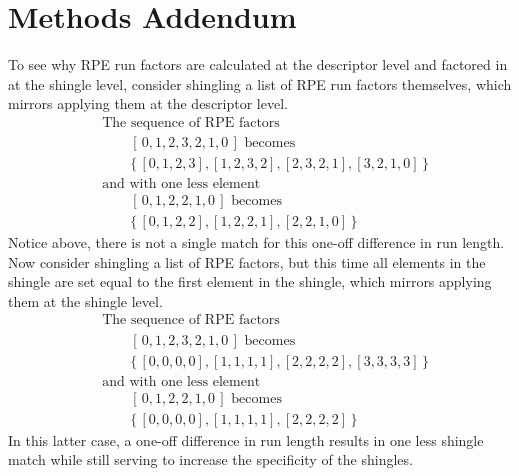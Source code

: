 \documentclass[letter]{article}
\begin{document}
\section{Methods Addendum}

To see why RPE run factors are calculated at the descriptor level and factored in at the shingle level, consider shingling a list of RPE run factors themselves, which mirrors applying them at the descriptor level. 
\begin{align*}
    &\text{The sequence of RPE factors} \\
    &\qquad[\, 0, 1, 2, 3, 2, 1, 0 \,] \text{ becomes} \\
    &\qquad\{\, [0, 1, 2, 3], [1, 2, 3, 2], [2, 3, 2, 1], [3, 2, 1, 0] \,\} \\
    &\text{and with one less element} \\
    &\qquad[\, 0, 1, 2, 2, 1, 0 \,] \text{ becomes} \\
    &\qquad\{\, [0, 1, 2, 2], [1, 2, 2, 1], [2, 2, 1, 0] \,\}
\end{align*}
Notice above, there is not a single match for this one-off difference in run length.
Now consider shingling a list of RPE factors, but this time all elements in the shingle are set equal to the first element in the shingle, which mirrors applying them at the shingle level. 
\begin{align*}
    &\text{The sequence of RPE factors} \\
    &\qquad[\, 0, 1, 2, 3, 2, 1, 0 \,] \text{ becomes} \\
    &\qquad\{\, [0, 0, 0, 0], [1, 1, 1, 1], [2, 2, 2, 2], [3, 3, 3, 3] \,\} \\
    &\text{and with one less element} \\
    &\qquad[\, 0, 1, 2, 2, 1, 0 \,] \text{ becomes} \\
    &\qquad\{\, [0, 0, 0, 0], [1, 1, 1, 1], [2, 2, 2, 2] \,\}
\end{align*}
In this latter case, a one-off difference in run length results in one less shingle match while still serving to increase the specificity of the shingles. 
\end{document}
